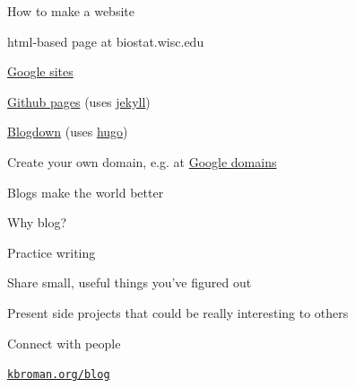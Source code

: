 \documentclass[12pt,t,aspectratio=169]{beamer}
\begin{document}
\begin{frame}[c]{How to make a website}

  \bbi
\item html-based page at biostat.wisc.edu
\item \href{https://sites.google.com}{Google sites}
\item \href{https://pages.github.com}{Github pages} (uses \href{https://jekyllrb.com}{jekyll})
\item \href{https://bookdown.org/yihui/blogdown}{Blogdown} (uses \href{https://gohugo.io}{hugo})
\item Create your own domain, e.g. at \href{https://domains.google.com}{Google domains}
  \ei

  \bigskip \bigskip


\end{frame}




{

\begin{frame}[c]{}

\centerline{
\color{background}
  \Large Blogs make the world better
}


\end{frame}
}


\begin{frame}[c]{Why blog?}

  \bbi
\item Practice writing
\item Share small, useful things you've figured out
\item Present side projects that could be really interesting to others
\item Connect with people
  \ei

\end{frame}


\begin{frame}[c]{}


\vfill \hfill \href{https://kbroman.org/blog}{\tt \small \lolit kbroman.org/blog}

\end{frame}



\begin{frame}[c]{}



\end{frame}
\end{document}
